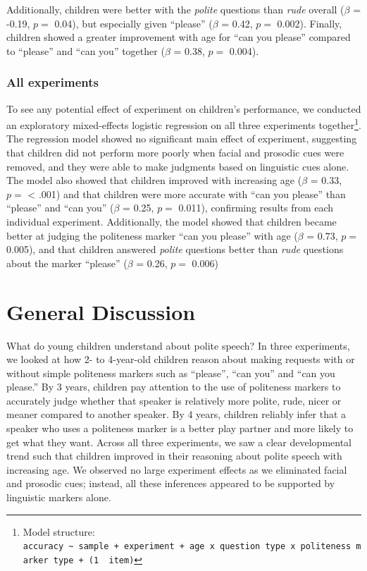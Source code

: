\documentclass[10pt, letterpaper]{article}
\begin{document}
Additionally, children were better with the \emph{polite} questions than
\emph{rude} overall (\(\beta\) = -0.19, \(p =\) 0.04), but especially
given ``please'' (\(\beta\) = 0.42, \(p =\) 0.002). Finally, children
showed a greater improvement with age for ``can you please'' compared to
``please'' and ``can you'' together (\(\beta\) = 0.38, \(p =\) 0.004).

\subsubsection{All experiments}\label{all-experiments}

To see any potential effect of experiment on children's performance, we
conducted an exploratory mixed-effects logistic regression on all three
experiments together\footnote{Model structure:
  \texttt{accuracy\ \textasciitilde{}\ sample\ +\ experiment\ +\ age\ x\ question\ type\ x\ politeness\ marker\ type\ +\ (1\ \textbar{}\ item)}}.
The regression model showed no significant main effect of experiment,
suggesting that children did not perform more poorly when facial and
prosodic cues were removed, and they were able to make judgments based
on linguistic cues alone. The model also showed that children improved
with increasing age (\(\beta\) = 0.33, \(p =\) \textless{} .001) and
that children were more accurate with ``can you please'' than ``please''
and ``can you'' (\(\beta\) = 0.25, \(p =\) 0.011), confirming results
from each individual experiment. Additionally, the model showed that
children became better at judging the politeness marker ``can you
please'' with age (\(\beta\) = 0.73, \(p =\) 0.005), and that children
answered \emph{polite} questions better than \emph{rude} questions about
the marker ``please'' (\(\beta\) = 0.26, \(p =\) 0.006)

\section{General Discussion}\label{general-discussion}

What do young children understand about polite speech? In three
experiments, we looked at how 2- to 4-year-old children reason about
making requests with or without simple politeness markers such as
``please'', ``can you'' and ``can you please.'' By 3 years, children pay
attention to the use of politeness markers to accurately judge whether
that speaker is relatively more polite, rude, nicer or meaner compared
to another speaker. By 4 years, children reliably infer that a speaker
who uses a politeness marker is a better play partner and more likely to
get what they want. Across all three experiments, we saw a clear
developmental trend such that children improved in their reasoning about
polite speech with increasing age. We observed no large experiment
effects as we eliminated facial and prosodic cues; instead, all these
inferences appeared to be supported by linguistic markers alone.
\end{document}
